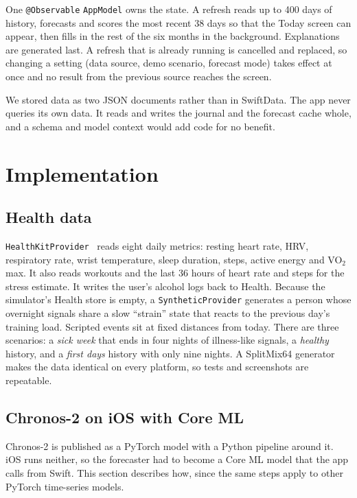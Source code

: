 \documentclass[11pt,a4paper]{article}
\begin{document}
One \texttt{@Observable} \texttt{AppModel} owns the state. A refresh reads up to 400 days of history, forecasts and scores the most recent 38 days so that the Today screen can appear, then fills in the rest of the six months in the background. Explanations are generated last. A refresh that is already running is cancelled and replaced, so changing a setting (data source, demo scenario, forecast mode) takes effect at once and no result from the previous source reaches the screen.

We stored data as two JSON documents rather than in SwiftData. The app never queries its own data. It reads and writes the journal and the forecast cache whole, and a schema and model context would add code for no benefit.

\section{Implementation}

\subsection{Health data}
\texttt{HealthKitProvider}~\cite{apple_healthkit} reads eight daily metrics: resting heart rate, HRV, respiratory rate, wrist temperature, sleep duration, steps, active energy and VO$_2$max. It also reads workouts and the last 36 hours of heart rate and steps for the stress estimate. It writes the user's alcohol logs back to Health. Because the simulator's Health store is empty, a \texttt{SyntheticProvider} generates a person whose overnight signals share a slow ``strain'' state that reacts to the previous day's training load. Scripted events sit at fixed distances from today. There are three scenarios: a \emph{sick week} that ends in four nights of illness-like signals, a \emph{healthy} history, and a \emph{first days} history with only nine nights. A SplitMix64 generator makes the data identical on every platform, so tests and screenshots are repeatable.

\subsection{Chronos-2 on iOS with Core ML}\label{sec:forecast}
Chronos-2 is published as a PyTorch model with a Python pipeline around it. iOS runs neither, so the forecaster had to become a Core ML model that the app calls from Swift. This section describes how, since the same steps apply to other PyTorch time-series models.
\end{document}
